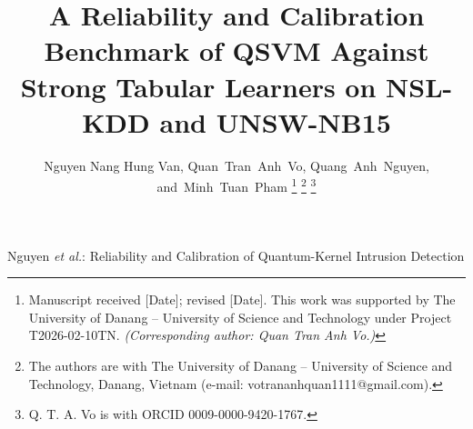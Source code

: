 \documentclass[journal]{IEEEtran}
\begin{document}
\let\flushbottom\raggedbottom
\raggedbottom

\title{A Reliability and Calibration Benchmark of QSVM Against Strong
  Tabular Learners on NSL-KDD and UNSW-NB15}

\author{Nguyen Nang Hung Van,
        Quan~Tran~Anh~Vo,
        Quang~Anh~Nguyen,
        and~Minh~Tuan~Pham
\thanks{Manuscript received [Date]; revised [Date]. This work was
  supported by The University of Danang -- University of Science and
  Technology under Project T2026-02-10TN. \textit{(Corresponding author: Quan Tran Anh Vo.)}}
\thanks{The authors are with The University of Danang -- University of
  Science and Technology, Danang, Vietnam (e-mail:
  votrananhquan1111@gmail.com).}
\thanks{Q. T. A. Vo is with ORCID 0009-0000-9420-1767.}}

%
{Nguyen \MakeLowercase{\textit{et al.}}: Reliability and Calibration of Quantum-Kernel Intrusion Detection}

\maketitle
\end{document}
